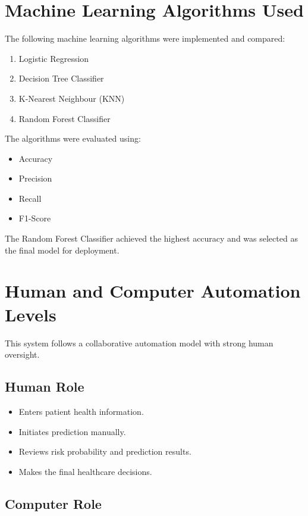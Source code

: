 \documentclass[12pt]{article}
\begin{document}
\section*{Machine Learning Algorithms Used}

The following machine learning algorithms were implemented and compared:

\begin{enumerate}
    \item Logistic Regression
    \item Decision Tree Classifier
    \item K-Nearest Neighbour (KNN)
    \item Random Forest Classifier
\end{enumerate}

The algorithms were evaluated using:
\begin{itemize}
    \item Accuracy
    \item Precision
    \item Recall
    \item F1-Score
\end{itemize}

The Random Forest Classifier achieved the highest accuracy and was selected as the final model for deployment.

\section*{Human and Computer Automation Levels}

This system follows a collaborative automation model with strong human oversight.

\subsection*{Human Role}

\begin{itemize}
    \item Enters patient health information.
    \item Initiates prediction manually.
    \item Reviews risk probability and prediction results.
    \item Makes the final healthcare decisions.
\end{itemize}

\subsection*{Computer Role}
\end{document}
